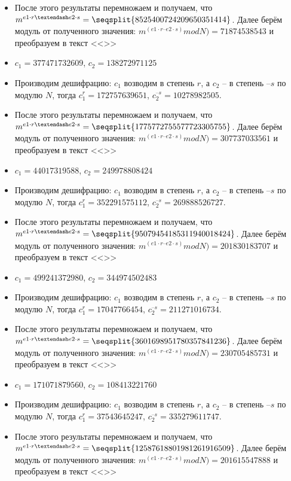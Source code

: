\begin{itemize}
\item После этого результаты перемножаем и получаем, что $m ^ {e1 \cdot r – e2 \cdot s} = \seqsplit{8525400724209650351414}$. Далее берём модуль от полученного значения:  $m ^ {(e1 \cdot r – e2 \cdot s)} mod N) = 71874538543$ и преобразуем в текст <<>>
\item $c_1 = 377471732609$, $c_2=138272971125$
\item Производим дешифрацию: $c_1$ возводим в степень $r$, а $c_2$ – в степень $–s$ по модулю $N$, тогда $c_1 ^ r = 172757639651$, $c_2 ^{–s} = 10278982505$.
\item После этого результаты перемножаем и получаем, что $m ^ {e1 \cdot r – e2 \cdot s} = \seqsplit{1775772755577723305755}$. Далее берём модуль от полученного значения:  $m ^ {(e1 \cdot r – e2 \cdot s)} mod N) = 307737033561$ и преобразуем в текст <<>>
\item $c_1 = 44017319588$, $c_2=249978808424$
\item Производим дешифрацию: $c_1$ возводим в степень $r$, а $c_2$ – в степень $–s$ по модулю $N$, тогда $c_1 ^ r = 352291575112$, $c_2 ^{–s} = 269888526727$.
\item После этого результаты перемножаем и получаем, что $m ^ {e1 \cdot r – e2 \cdot s} = \seqsplit{95079454185311940018424}$. Далее берём модуль от полученного значения:  $m ^ {(e1 \cdot r – e2 \cdot s)} mod N) = 201830183707$ и преобразуем в текст <<>>
\item $c_1 = 499241372980$, $c_2=344974502483$
\item Производим дешифрацию: $c_1$ возводим в степень $r$, а $c_2$ – в степень $–s$ по модулю $N$, тогда $c_1 ^ r = 17047766454$, $c_2 ^{–s} = 211271016734$.
\item После этого результаты перемножаем и получаем, что $m ^ {e1 \cdot r – e2 \cdot s} = \seqsplit{3601698951780357841236}$. Далее берём модуль от полученного значения:  $m ^ {(e1 \cdot r – e2 \cdot s)} mod N) = 230705485731$ и преобразуем в текст <<>>
\item $c_1 = 171071879560$, $c_2=108413221760$
\item Производим дешифрацию: $c_1$ возводим в степень $r$, а $c_2$ – в степень $–s$ по модулю $N$, тогда $c_1 ^ r = 37543645247$, $c_2 ^{–s} = 335279611747$.
\item После этого результаты перемножаем и получаем, что $m ^ {e1 \cdot r – e2 \cdot s} = \seqsplit{12587618801981261916509}$. Далее берём модуль от полученного значения:  $m ^ {(e1 \cdot r – e2 \cdot s)} mod N) = 201615547888$ и преобразуем в текст <<>>
\end{itemize}
